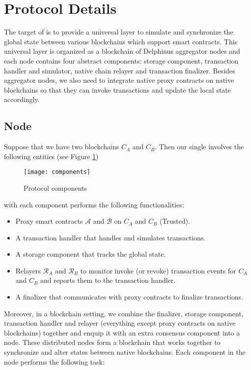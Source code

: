 \section{Protocol Details}
\label{chp:protocol-details}
The target of \dprotocol is to provide a universal layer to simulate and synchronize the global state between various blockchains which support smart contracts. This universal layer is organized as a blockchain of Delphinus aggregator nodes and each node contains four abstract components: storage component, transaction handler and simulator, native chain relayer and transaction finalizer.  Besides aggregator nodes, we also need to 
integrate native proxy contracts on native blockchains so that they can invoke transactions and update the local state accordingly.


\subsection{\dprotocol Node}
Suppose that we have two blockchains $C_{A}$ and $C_{B}$. Then our single \dprotocol involves the following entities (see Figure \ref{protocol-components})
\begin{figure}[!ht]
\centerline{\texttt{[image: components]}}
\caption{Protocol components}
\label{protocol-components}
\end{figure}

\noindent with each component performs the following functionalities:
\begin{itemize}
\item  Proxy smart contracts $\mathcal{A}$ and $\mathcal{B}$ on $C_A$ and $C_B$ (Trusted).
\item  A transaction handler that handles and simulates transactions.
\item  A storage component that tracks the global state.
\item  Relayers $\mathcal{R}_A$ and $\mathcal{R}_B$ to monitor invoke (or revoke) transaction events for $C_A$ and $C_B$ and reports them to the transaction handler.
\item  A finalizer that communicates with proxy contracts to finalize transactions.
\end{itemize}
\smallskip
Moreover, in a blockchain setting, we combine the finalizer, storage component, transaction handler and relayer (everything except proxy contracts on native blockchains) together and enquip it with an extra consensus component into a \dprotocol node. These distributed \dprotocol nodes form a blockchain that works together to synchronize and alter states between native blockchains. Each component in the node performs the following task:

